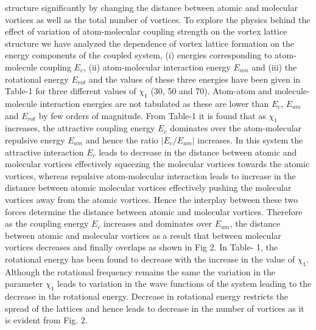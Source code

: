 \documentclass[10pt,a4paper]{article}
\begin{document}
structure significantly by changing the distance between atomic
and molecular vortices as well as the total number of vortices. To
explore the physics behind the effect of variation of
atom-molecular coupling strength on the vortex lattice structure
we have analyzed the dependence of vortex lattice formation on the
energy components of the coupled system, (i) energies
corresponding to atom-molecule coupling $E _c$, (ii)
atom-molecular interaction energy $E _{am}$ and (iii) the rotational
energy $E_{rot}$ and the values of these three energies have been
given in Table-1 for three different values of $\chi_1$ (30, 50
and 70). Atom-atom and molecule-molecule interaction energies are
not tabulated as these are lower than $E _c$, $E _{am}$ and $E
_{rot}$ by few orders of magnitude. From Table-1 it is found that
as $\chi_1$ increases, the attractive coupling energy $E _c$
dominates over the atom-molecular repulsive energy $E_{am}$ and hence
the ratio $|E_c/E_{am}|$ increases. In this system the attractive
interaction $E _c$ leads to decrease in the distance between
atomic and molecular vortices effectively squeezing the molecular
vortices towards the atomic vortices, whereas repulsive atom-molecular interaction leads to increase in the distance between
atomic molecular vortices effectively pushing the molecular
vortices away from the atomic vortices. Hence the interplay
between these two forces determine the distance between atomic and
molecular vortices. Therefore as the coupling energy $E _c$
increases and dominates over $E_{am}$, the distance between atomic
and molecular vortices as a result that between molecular vortices
decreases and finally overlaps as shown in Fig 2. In Table- 1, the
rotational energy has  been found to decrease with the
increase in the value of $\chi_1$. Although the rotational
frequency remains the same the variation in the parameter $\chi_1$
leads to variation in the wave functions of the system leading to
the decrease in the rotational energy. Decrease in rotational
energy restricts the spread of the lattices and hence leads to
decrease in the number of vortices as it is evident from Fig. 2.
\end{document}
